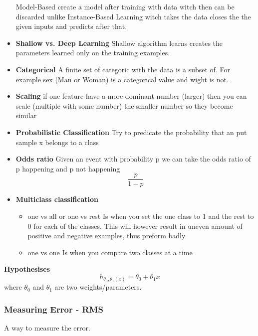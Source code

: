 \begin{itemize}
    Model-Based create a model after training with data witch then can be discarded unlike 
    Instance-Based Learning witch takes the data closes the the given inputs and predicts after that. 
    \item \textbf{Shallow vs. Deep Learning}
    Shallow algorithm learns creates the parameters learned only on the training examples.
    \item \textbf{Categorical} \newline
    A finite set of categoric with the data is a subset of. For example sex (Man or Woman) is a categorical value and wight is not.
    \item \textbf{Scaling} \newline
    if one feature have a more dominant number (larger) then you can scale (multiple with some number) the smaller number so they become similar
    \item \textbf{Probabilistic Classification} \newline 
    Try to predicate the probability that an put sample x belongs to a class
    \item \textbf{Odds ratio} \newline 
    Given an event with probability p we can take the odds ratio of p happening and p not happening
    \begin{equation*}
        \frac{p}{1-p}
    \end{equation*}
    \item \textbf{Multiclass classification}
    \begin{itemize}
        \item one vs all or one vs rest \newline
        Is when you set the one class to 1 and the rest to 0 for each of the classes. This will however result in uneven amount of positive and negative examples, thus preform badly
        \item one vs one \newline 
        Is when you compare two classes at a time
    \end{itemize}
\end{itemize}

\textbf{Hypothesises}
\begin{equation*}
    h_{\theta_0,\theta_1(x)} = \theta_0 + \theta_1 x
\end{equation*}
where $\theta_0$ and $\theta_1$ are two weights/parameters.

\subsubsection{Measuring Error - RMS}
A way to measure the error.

